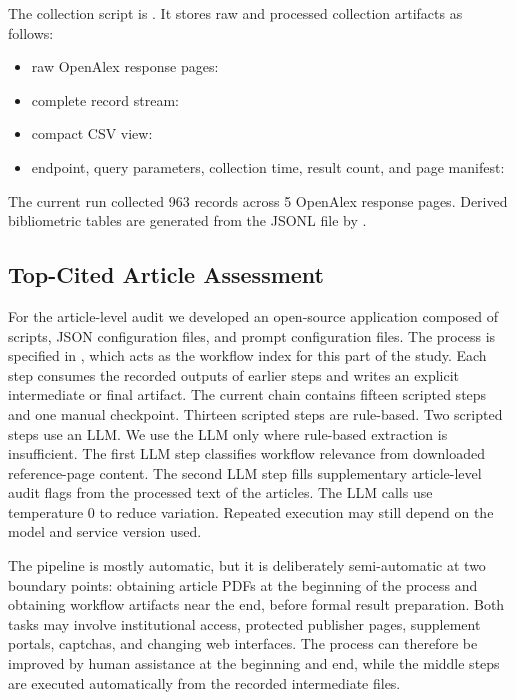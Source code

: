 \documentclass[runningheads]{llncs}
\begin{document}
The collection script is
.
It stores raw and processed collection artifacts as follows:
\begin{itemize}
\item raw OpenAlex response pages:
\item complete record stream:
\item compact CSV view:
\item endpoint, query parameters, collection time, result count, and page
manifest:
\end{itemize}
The current run collected 963 records across 5 OpenAlex response pages.
Derived bibliometric tables are generated from the JSONL file by
.

\subsection{Top-Cited Article Assessment}

For the article-level audit we developed an open-source application composed
of scripts, JSON configuration files, and prompt configuration files. The
process is specified in , which acts as
the workflow index for this part of the study. Each step consumes the recorded
outputs of earlier steps and writes an explicit intermediate or final artifact.
The current chain contains fifteen scripted steps and one manual checkpoint.
Thirteen scripted steps are rule-based. Two scripted steps use an LLM.
We use the LLM only where rule-based extraction is insufficient. The first LLM
step classifies workflow relevance from downloaded reference-page content. The
second LLM step fills supplementary article-level audit flags from the
processed text of the articles. The LLM calls use temperature 0 to reduce
variation. Repeated execution may still depend on the model and service version
used.

The pipeline is mostly automatic, but it is deliberately semi-automatic at two boundary
points: obtaining article PDFs at the beginning of the process and obtaining
workflow artifacts near the end, before formal result preparation.
Both tasks may involve institutional access, protected publisher pages,
supplement portals, captchas, and changing web interfaces. The process can
therefore be improved by human assistance at the beginning and end, while the
middle steps are executed automatically from the recorded intermediate files.
\end{document}
